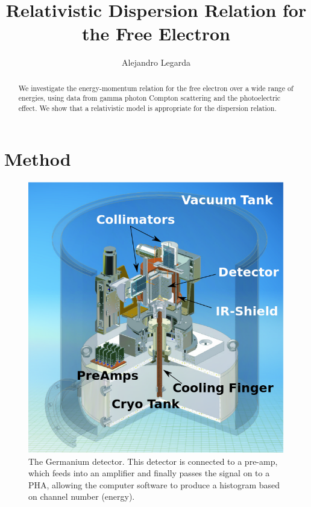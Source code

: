 \documentclass{article}
\title{Relativistic Dispersion Relation for the Free Electron}
\author{Alejandro Legarda}
\begin{document}
\raggedright
\maketitle

\begin{abstract}
We investigate the energy-momentum relation for the free electron over a wide range of energies, using data from gamma photon Compton scattering and the photoelectric effect. We show that a relativistic model is appropriate for the dispersion relation.
\end{abstract}

\tableofcontents
\newpage

\section{Method}

\begin{figure}[!htb]
	\centering
	\includegraphics[scale=.5]{plots/galatea_setup_sketch.png}
  	\caption{The Germanium detector. This detector is connected to a pre-amp, which feeds into an amplifier and finally passes the signal on to a PHA, allowing the computer software to produce a histogram based on channel number (energy).} 
 	\label{Apparatus}
\end{figure}
\end{document}
